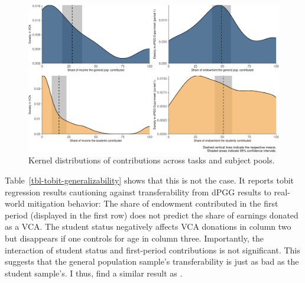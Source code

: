 \documentclass[
  authoryear,
  preprint,
  3p]{elsarticle}
\begin{document}
\begin{figure}

{\centering \includegraphics{paper_files/figure-pdf/fig-kernel-generalizability-1.pdf}

}

\caption{\label{fig-kernel-generalizability}Kernel distributions of
contributions across tasks and subject pools.}

\end{figure}

Table~\ref{tbl-tobit-generalizability} shows that this is not the case.
It reports tobit regression results cautioning against transferability
from dPGG results to real-world mitigation behavior: The share of
endowment contributed in the first period (displayed in the first row)
does not predict the share of earnings donated as a VCA. The student
status negatively affects VCA donations in column two but disappears if
one controls for age in column three. Importantly, the interaction of
student status and first-period contributions is not significant. This
suggests that the general population sample's transferability is just as
bad as the student sample's. I thus, find a similar result as
\citet[p.6]{GKLS2020}.
\end{document}
